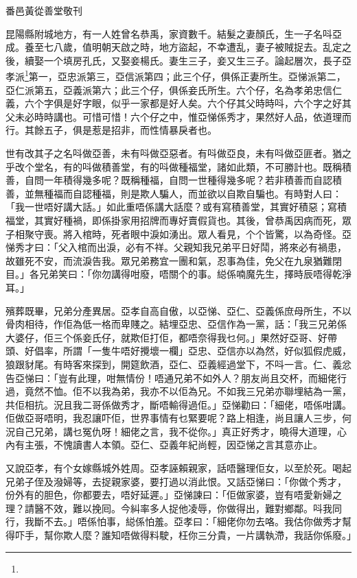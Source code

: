 \documentclass[a5paper, 12pt, openany]{book} %
\begin{document}
	番邑黃從善堂敬刊

	昆陽縣附城地方，有一人姓曾名恭禹，家資數千。結髮之妻顏氏，生一子名呌亞成。養至七八歲，值明朝天啟之時，地方盜起，不幸遭乱，妻子被賊捉去。乱定之後，續娶一个填房孔氏，又娶妾楊氏。妻生三子，妾又生三子。論起層次，長子亞孝派\footnote{}第一，亞忠派第三，亞信派第四；此三个仔，俱係正妻所生。亞悌派第二，亞仁派第五，亞義派第六；此三个仔，俱係妾氏所生。六个仔，名為孝弟忠信仁義，六个字俱是好字眼，似乎一家都是好人矣。六个仔其父時時呌，六个字之好其父未必時時講也。可惜可惜！六个仔之中，惟亞悌係秀才，果然好人品，依道理而行。其餘五子，俱是惹是招非，而性情暴戾者也。

	世有改其子之名呌做亞善，未有呌做亞惡者。有呌做亞良，未有呌做亞匪者。猶之乎改个堂名，有的呌做積善堂，有的呌做種福堂，諸如此類，不可勝計也。既稱積善，自問一年積得幾多呢？既稱種福，自問一世種得幾多呢？若非積善而自認積善，並無種福而自認種福，則是欺人騙人，而並欲以自欺自騙也。有時對人曰：「我一世唔好講大話。」如此重唔係講大話麼？或有寫積善堂，其實好積惡；寫積福堂，其實好種禍，即係掛家用招牌而專好賣假貨也。其後，曾恭禹因病而死，眾子相聚守喪。將入棺時，死者眼中淚如湧出。眾人看見，个个皆驚，以為奇怪。亞悌秀才曰：「父入棺而出淚，必有不祥。父親知我兄弟平日好鬦，將來必有禍患，故雖死不安，而流淚告我。眾兄弟務宜一團和氣，忍事為佳，免父在九泉猶難閉目。」各兄弟笑曰：「你勿講得咁廢，唔關个的事。縂係喃魔先生，擇時辰唔得乾淨耳。」

	殯葬既畢，兄弟分產異居。亞孝自高自傲，以亞悌、亞仁、亞義係庶母所生，不以骨肉相待，作佢為低一格而卑賤之。結埋亞忠、亞信作為一黨，話：「我三兄弟係大婆仔，佢三个係妾氏仔，就欺佢打佢，都唔奈得我乜何。」果然好亞哥、好帶頭、好倡率，所謂「一隻牛唔好攪壞一欄」亞忠、亞信亦以為然，好似狐假虎威，狼跟豺尾。有時客來探到，開筵飲酒，亞仁、亞義經過堂下，不呌一言。仁、義忿告亞悌曰：「豈有此理，咁無情份！唔通兄弟不如外人？朋友尚且交杯，而細佬行過，竟然不恤。佢不以我為弟，我亦不以佢為兄。不如我三兄弟亦聯埋結為一黨，共佢相抗。況且我二哥係做秀才，斷唔輸得過佢。」亞悌勸曰：「細佬，唔係咁講。佢做亞哥唔明，我忍讓吓佢，世界事情有乜緊要呢？路上相逢，尚且讓人三步，何況自己兄弟，講乜冤仇呀！細佬之言，我不從你。」真正好秀才，曉得大道理，心內有主張，不愧讀書人本領。亞仁、亞義年紀尚輕，因亞悌之言其意亦止。

	又說亞孝，有个女嫁縣城外姓周。亞孝誣賴親家，話唔醫理佢女，以至於死。喝起兄弟子侄及潑婦等，去捉親家婆，要打過以消此恨。又話亞悌曰：「你做个秀才，份外有的胆色，你都要去，唔好延遲。」亞悌諫曰：「佢做家婆，豈有唔愛新婦之理？請醫不效，難以挽囘。今糾率多人捉他凌辱，你做得出，難對鄉鄰。呌我同行，我斷不去。」唔係怕事，縂係怕羞。亞孝曰：「細佬你勿去咯。我估你做秀才幫得吓手，幫你欺人麼？誰知唔做得料駛，枉你三分貴，一片講執滯，我話你係廢。」
\end{document}
